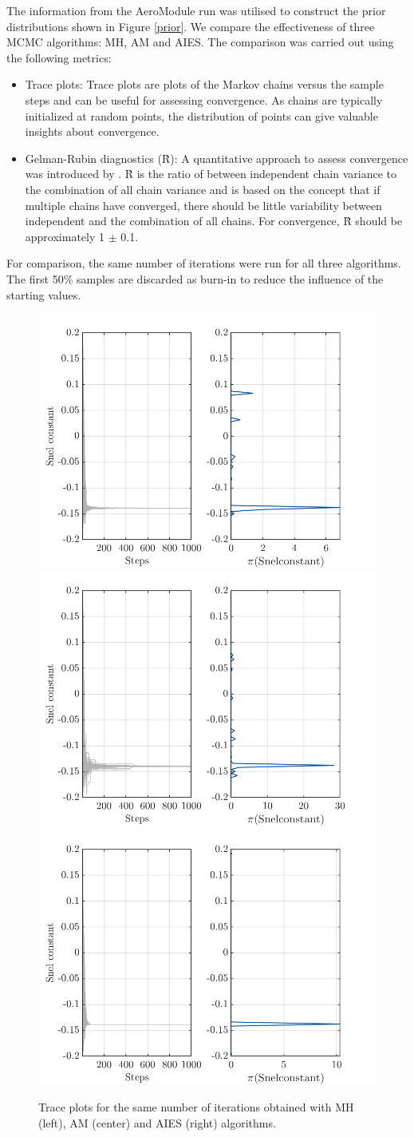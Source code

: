 \documentclass[11pt]{article}
\begin{document}
The information from the AeroModule run was utilised
to construct the prior distributions shown in Figure \ref{prior}. We compare the effectiveness of three MCMC algorithms: MH, AM and AIES. The comparison was carried out using the following metrics:

\begin{itemize}
    \item Trace plots: Trace plots are plots of the Markov chains versus the sample steps and can be useful for assessing convergence. As chains are typically initialized at random points,  the distribution of points can give valuable insights about convergence. 
    \item Gelman-Rubin diagnostics (\^{R}): A quantitative approach to assess convergence was introduced by  \citet{gelman}. \^{R} is the ratio of
between independent chain variance to  the combination of all chain variance
and is based on the concept that if multiple
chains have converged, there should be little variability between independent and the combination of all chains. For convergence, \^{R} should be approximately 1 $\pm$ 0.1. 
\end{itemize}

For comparison, the same number of iterations were run for all three algorithms. The first 50\% samples are discarded as burn-in to reduce the influence of the starting values.

\begin{figure}[htp]

\centering
\includegraphics[width=.3\textwidth]{ trace_mh.png}\hfill
\includegraphics[width=.3\textwidth]{ trace_am.png}\hfill
\includegraphics[width=.3\textwidth]{ trace.png}

\caption{Trace plots for the same number of iterations obtained with MH (left), AM (center) and AIES (right) algorithms.}
\label{trace}

\end{figure}
\end{document}
